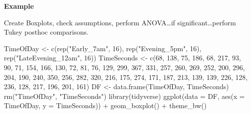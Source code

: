 \documentclass[
]{article}
\newenvironment{Shaded}{\begin{snugshade}}{\end{snugshade}}
\newcommand{\AttributeTok}[1]{\textcolor[rgb]{0.77,0.63,0.00}{#1}}
\newcommand{\DecValTok}[1]{\textcolor[rgb]{0.00,0.00,0.81}{#1}}
\newcommand{\FunctionTok}[1]{\textcolor[rgb]{0.00,0.00,0.00}{#1}}
\newcommand{\NormalTok}[1]{#1}
\newcommand{\OtherTok}[1]{\textcolor[rgb]{0.56,0.35,0.01}{#1}}
\newcommand{\SpecialCharTok}[1]{\textcolor[rgb]{0.00,0.00,0.00}{#1}}
\newcommand{\StringTok}[1]{\textcolor[rgb]{0.31,0.60,0.02}{#1}}
\begin{document}
\textbf{Example}

Create Boxplots, check assumptions, perform ANOVA\ldots if significant\ldots perform Tukey posthoc comparisons.

\begin{Shaded}
\begin{Highlighting}[]
\NormalTok{TimeOfDay }\OtherTok{\textless{}{-}} \FunctionTok{c}\NormalTok{(}\FunctionTok{rep}\NormalTok{(}\StringTok{"Early\_7am"}\NormalTok{, }\DecValTok{16}\NormalTok{), }\FunctionTok{rep}\NormalTok{(}\StringTok{"Evening\_5pm"}\NormalTok{, }\DecValTok{16}\NormalTok{), }\FunctionTok{rep}\NormalTok{(}\StringTok{"LateEvening\_12am"}\NormalTok{, }\DecValTok{16}\NormalTok{))}
\NormalTok{TimeSeconds }\OtherTok{\textless{}{-}} \FunctionTok{c}\NormalTok{(}\DecValTok{68}\NormalTok{, }\DecValTok{138}\NormalTok{, }\DecValTok{75}\NormalTok{, }\DecValTok{186}\NormalTok{, }\DecValTok{68}\NormalTok{, }\DecValTok{217}\NormalTok{, }\DecValTok{93}\NormalTok{, }\DecValTok{90}\NormalTok{, }\DecValTok{71}\NormalTok{, }\DecValTok{154}\NormalTok{, }\DecValTok{166}\NormalTok{, }\DecValTok{130}\NormalTok{, }\DecValTok{72}\NormalTok{, }\DecValTok{81}\NormalTok{, }\DecValTok{76}\NormalTok{, }\DecValTok{129}\NormalTok{, }\DecValTok{299}\NormalTok{, }
                 \DecValTok{367}\NormalTok{, }\DecValTok{331}\NormalTok{, }\DecValTok{257}\NormalTok{, }\DecValTok{260}\NormalTok{, }\DecValTok{269}\NormalTok{, }\DecValTok{252}\NormalTok{, }\DecValTok{200}\NormalTok{, }\DecValTok{296}\NormalTok{, }\DecValTok{204}\NormalTok{, }\DecValTok{190}\NormalTok{, }\DecValTok{240}\NormalTok{, }\DecValTok{350}\NormalTok{, }\DecValTok{256}\NormalTok{, }\DecValTok{282}\NormalTok{, }\DecValTok{320}\NormalTok{, }
                 \DecValTok{216}\NormalTok{, }\DecValTok{175}\NormalTok{, }\DecValTok{274}\NormalTok{, }\DecValTok{171}\NormalTok{, }\DecValTok{187}\NormalTok{, }\DecValTok{213}\NormalTok{, }\DecValTok{139}\NormalTok{, }\DecValTok{139}\NormalTok{, }\DecValTok{226}\NormalTok{, }\DecValTok{128}\NormalTok{, }\DecValTok{236}\NormalTok{, }\DecValTok{128}\NormalTok{, }\DecValTok{217}\NormalTok{, }\DecValTok{196}\NormalTok{, }\DecValTok{201}\NormalTok{, }\DecValTok{161}\NormalTok{)}
\NormalTok{DF }\OtherTok{\textless{}{-}} \FunctionTok{data.frame}\NormalTok{(TimeOfDay, TimeSeconds)}
\FunctionTok{rm}\NormalTok{(}\StringTok{"TimeOfDay"}\NormalTok{, }\StringTok{"TimeSeconds"}\NormalTok{)}
\FunctionTok{library}\NormalTok{(tidyverse)}
\FunctionTok{ggplot}\NormalTok{(}\AttributeTok{data =}\NormalTok{ DF, }\FunctionTok{aes}\NormalTok{(}\AttributeTok{x =}\NormalTok{ TimeOfDay, }\AttributeTok{y =}\NormalTok{ TimeSeconds)) }\SpecialCharTok{+}
  \FunctionTok{geom\_boxplot}\NormalTok{() }\SpecialCharTok{+} 
  \FunctionTok{theme\_bw}\NormalTok{()}
\end{Highlighting}
\end{Shaded}
\end{document}
